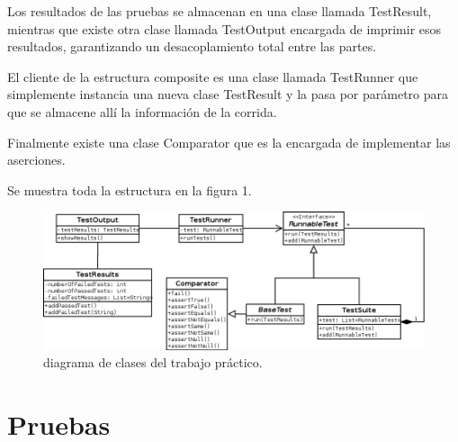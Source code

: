 \documentclass[12pt]{article}
\begin{document}
Los resultados de las pruebas se almacenan en una clase llamada TestResult,
mientras que existe otra clase llamada TestOutput encargada de imprimir esos
resultados, garantizando un desacoplamiento total entre las partes.

El cliente de la estructura composite es una clase llamada TestRunner que
simplemente instancia una nueva clase TestResult y la pasa por parámetro para 
que se almacene allí la información de la corrida.

Finalmente existe una clase Comparator que es la encargada de implementar las 
aserciones.

Se muestra toda la estructura en la figura 1.

\begin{figure}[h]
\begin{center}
	\includegraphics[scale=0.50,angle=90]{./ClassDiagram}
\end{center}
	\caption{diagrama de clases del trabajo práctico.}
\end{figure}

\section{Pruebas}
\end{document}
